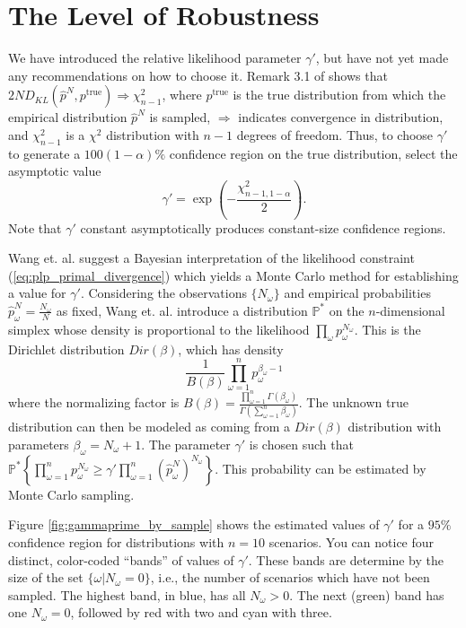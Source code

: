 \documentclass[11pt]{article}
\renewcommand{\P}{\mathbb{P}}
\newcommand{\ptrue}{p^{\text{true}}}
\begin{document}
\section{The Level of Robustness}
\label{sec:robust_level}

We have introduced the relative likelihood parameter $\gamma'$, but have not yet made any recommendations on how to choose it.
Remark 3.1 of \cite{pardo2005statistical} shows that $2ND_{KL}(\hat{p}^N, \ptrue) \Rightarrow \chi^2_{n-1}$, where $\ptrue$ is the true distribution from which the empirical distribution $\hat{p}^N$ is sampled, $\Rightarrow$ indicates convergence in distribution, and $\chi^2_{n-1}$ is a $\chi^2$ distribution with $n-1$ degrees of freedom.
Thus, to choose $\gamma'$ to generate a $100(1-\alpha)\%$ confidence region on the true distribution, select the asymptotic value
\begin{equation} \label{eq:asymptotic_gamma}
	\gamma' = \exp \left( -\frac{\chi^2_{n-1,1-\alpha}}{2} \right).
\end{equation}
Note that $\gamma'$ constant asymptotically produces constant-size confidence regions.

Wang et. al. \cite{wang2010likelihood} suggest a Bayesian interpretation of the likelihood constraint (\ref{eq:plp_primal_divergence}) which yields a Monte Carlo method for establishing a value for $\gamma'$.
Considering the observations $\{N_\omega\}$ and empirical probabilities $\hat{p}^N_\omega = \frac{N_\omega}{N}$ as fixed, Wang et. al. \cite{wang2010likelihood} introduce a distribution $\P^*$ on the $n$-dimensional simplex whose density is proportional to the likelihood $\prod_\omega p_\omega^{N_\omega}$.
This is the Dirichlet distribution $Dir(\beta)$, which has density
\[
	\frac{1}{B(\beta)} \prod_{\omega=1}^n p_\omega^{\beta_\omega-1}
\]
where the normalizing factor is $B(\beta) = \frac{\prod_{\omega=1}^n \Gamma(\beta_\omega)}{\Gamma\left( \sum_{\omega=1}^n \beta_\omega \right)}$.
The unknown true distribution can then be modeled as coming from a $Dir(\beta)$ distribution with parameters $\beta_\omega = N_\omega + 1$.
The parameter $\gamma'$ is chosen such that $\P^*\left\{ \prod_{\omega=1}^n p_\omega^{N_\omega} \geq \gamma' \prod_{\omega=1}^n (\hat{p}^N_\omega)^{N_\omega} \right\}$.
This probability can be estimated by Monte Carlo sampling.

Figure \ref{fig:gammaprime_by_sample} shows the estimated values of $\gamma'$ for a $95\%$ confidence region for distributions with $n = 10$ scenarios.
You can notice four distinct, color-coded ``bands'' of values of $\gamma'$.
These bands are determine by the size of the set $\{\omega | N_\omega = 0\}$, i.e., the number of scenarios which have not been sampled.
The highest band, in blue, has all $N_\omega > 0$.
The next (green) band has one $N_\omega = 0$, followed by red with two and cyan with three.
\end{document}
